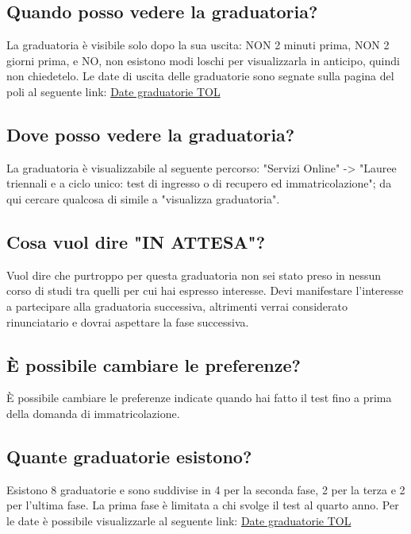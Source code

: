 \documentclass[legal]{polinetwork}
\begin{document}
\subsection{Quando posso vedere la graduatoria?}


La graduatoria è visibile solo dopo la sua uscita: NON 2 minuti prima, NON 2 giorni prima, e NO, non esistono modi loschi per visualizzarla in anticipo, quindi non chiedetelo. Le date di uscita delle graduatorie sono segnate sulla pagina del poli al seguente link: \href{https://www.polimi.it/futuri-studenti/test-e-ammissione/laurea/ingegneria/punteggi-e-formulazione-delle-graduatorie}{Date graduatorie TOL}

\subsection{Dove posso vedere la graduatoria?}


La graduatoria è visualizzabile al seguente percorso: "Servizi Online" -> "Lauree triennali e a ciclo unico: test di ingresso o di recupero ed immatricolazione"; da qui cercare qualcosa di simile a "visualizza graduatoria".

\subsection{Cosa vuol dire "IN ATTESA"?}


Vuol dire che purtroppo per questa graduatoria non sei stato preso in nessun corso di studi tra quelli per cui hai espresso interesse. Devi manifestare l'interesse a partecipare alla graduatoria successiva, altrimenti verrai considerato rinunciatario e dovrai aspettare la fase successiva.

\subsection{È possibile cambiare le preferenze?}


È possibile cambiare le preferenze indicate quando hai fatto il test fino a prima della domanda di immatricolazione.

\subsection{Quante graduatorie esistono?}


Esistono 8 graduatorie e sono suddivise in 4 per la seconda fase, 2 per la terza e 2 per l'ultima fase. La prima fase è limitata a chi svolge il test al quarto anno. Per le date è possibile visualizzarle al seguente link: \href{https://www.polimi.it/futuri-studenti/test-e-ammissione/laurea/ingegneria/punteggi-e-formulazione-delle-graduatorie}{Date graduatorie TOL}
\end{document}
